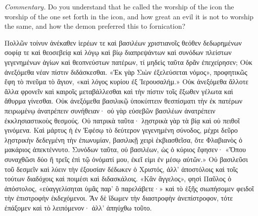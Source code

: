 \documentclass[10pt]{book}
\newcommand{\switchGreek}[1][]{\selectlanguage{polutonikogreek} \switchcolumn*[#1]}
\newcommand{\switchEnglish}{\selectlanguage{english} \switchcolumn}
\begin{document}
\begin{paracol}{2}
\emph{Commentary.}
Do you understand that he called the worship of the icon the worship of
the one set forth in the icon, and how great an evil it is not to
worship the same, and how the demon preferred this to fornication?

\switchGreek

Πολλῶν τοίνυν ἀνέκαθεν ἱερέων τε καὶ βασιλέων χριστιανοῖς θεόθεν δεδωρημένων
σοφίᾳ τε καὶ θεοσεβείᾳ καὶ λόγῳ καὶ βίῳ διαπρεψάντων καὶ συνόδων πλείστων
γεγενημένων ἁγίων καὶ θεοπνεύστων πατέρων, τί μηδεὶς ταῦτα δρᾶν ἐπεχείρησεν;
Οὐκ ἀνεξόμεθα νέαν πίστιν διδάσκεσθαι. «Ἐκ γὰρ Σιὼν ἐξελεύσεται νόμος»,
προφητικῶς ἔφη τὸ πνεῦμα τὸ ἅγιον, «καὶ λόγος κυρίου ἐξ Ἱερουσαλήμ.» Οὐκ
ἀνεξόμεθα ἄλλοτε ἄλλα φρονεῖν καὶ καιροῖς μεταβάλλεσθαι καὶ τὴν πίστιν τοῖς
ἔξωθεν γέλωτα καὶ ἄθυρμα γίνεσθαι. Οὐκ ἀνεξόμεθα βασιλικῷ ὑποκύπτειν
θεσπίσματι τὴν ἐκ πατέρων πειρωμένῳ ἀνατρέπειν συνήθειαν· οὐ γὰρ εὐσεβῶν
βασιλέων ἀνατρέπειν ἐκκλησιαστικοὺς θεσμούς. Οὐ πατρικὰ ταῦτα· λῃστρικὰ γὰρ τὰ
βίᾳ καὶ οὐ πειθοῖ γινόμενα. Καὶ μάρτυς ἡ ἐν Ἐφέσῳ τὸ δεύτερον γεγενημένη
σύνοδος, μέχρι δεῦρο λῃστρικὴν δεδεγμένη τὴν ἐπωνυμίαν, βασιλικῇ χειρὶ
ἐκβιασθεῖσα, ὅτε Φλαβιανὸς ὁ μακάριος ἀπεκτέννυτο. Συνόδων ταῦτα, οὐ βασιλέων,
ὡς ὁ κύριος ἔφησεν· «Ὅπου συναχθῶσι δύο ἢ τρεῖς ἐπὶ τῷ ὀνόματί μου, ἐκεῖ εἰμι
ἐν μέσῳ αὐτῶν.» Οὐ βασιλεῦσι τοῦ δεσμεῖν καὶ λύειν τὴν ἐξουσίαν δέδωκεν ὁ
Χριστός, ἀλλ’ ἀποστόλοις καὶ τοῖς τούτων διαδόχοις καὶ ποιμέσι καὶ
διδασκάλοις. «Κἂν ἄγγελος», φησὶ Παῦλος ὁ ἀπόστολος, «εὐαγγελίσηται ὑμᾶς παρ’
ὃ παρελάβετε·» καὶ τὸ ἑξῆς σιωπήσομεν φειδοῖ τὴν ἐπιστροφὴν ἐκδεχόμενοι. Ἂν δὲ
ἴδωμεν τὴν διαστροφὴν ἀνεπίστροφον, τότε ἐπάξομεν καὶ τὸ λειπόμενον· ἀλλ’
ἀπηύχθω τοῦτο.

\switchEnglish


\end{paracol}
\end{document}
